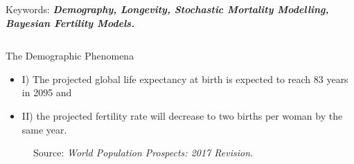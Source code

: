 \documentclass[]{beamer}
\begin{document}
\begin{frame}{\vspace{1ex}\hfill Keywords: \bfseries \textit{Demography, Longevity, Stochastic Mortality Modelling, Bayesian Fertility Models.}}
\begin{columns}[t]
\begin{block}{The Demographic Phenomena}
\begin{multicols}{2}
				\begin{itemize}
					\item I) The projected global life expectancy at birth is expected to reach 83 years in 2095 and
					\item II) the projected fertility rate will decrease to two births per woman by the same year.
				\end{itemize}
				\vspace{-0.3cm}
				\begin{figure}[h]
					\centering
					\caption{\small Source: \textit{World Population Prospects: 2017 Revision.}}
					\label{esperanza}
				\end{figure}


\end{multicols}
\end{block}
\end{columns}
\end{frame}
\end{document}
